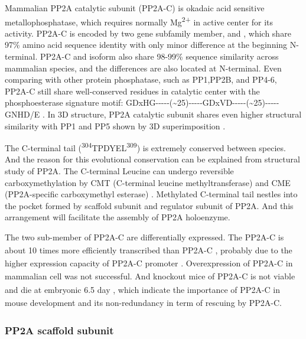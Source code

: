 Mammalian \gls{PP2A} catalytic subunit (PP2A-C) is okadaic acid sensitive metallophosphatase, which requires normally Mg\textsuperscript{2+} in active center for its activity. PP2A-C is encoded by two gene subfamily member, \textalpha{} and \textbeta{}, which share 97\% amino acid sequence identity with only minor difference at the beginning N-terminal. PP2A-C \textalpha{} and \textbeta{} isoform also share 98-99\% sequence similarity across mammalian species, and the differences are also located at N-terminal. Even comparing with other protein phosphatase, such as PP1,PP2B, and PP4-6, PP2A-C still share well-conserved residues in catalytic center with the phosphoesterase signature motif: GDxHG-{}-{}-{}-{}-(\textasciitilde25)-{}-{}-{}-{}-GDxVD-{}-{}-{}-{}-(\textasciitilde25)-{}-{}-{}-{}-GNHD/E \cite{ogris_catalytically_1999}. In 3D structure, PP2A catalytic subunit shares even higher structural similarity with PP1 and PP5 shown by 3D superimposition \cite{xing_structure_2006}.  


The C-terminal tail (\textsuperscript{304}TPDYEL\textsuperscript{309}) is extremely conserved between species. And the reason for this evolutional conservation can be explained from structural study of PP2A. The C-terminal Leucine can undergo reversible carboxymethylation by CMT (C-terminal leucine methyltransferase) and CME (PP2A-specific carboxymethyl esterase) \cite{mumby_3d_2007}. Methylated C-terminal tail nestles into the pocket formed by scaffold subunit and regulator subunit of PP2A. And this arrangement will facilitate the assembly of PP2A holoenzyme. 

The two sub-member of PP2A-C are differentially expressed. The PP2A-C\textsubscript{\textalpha} is about 10 times more efficiently transcribed than PP2A-C\textsubscript{\textbeta} \cite{khew-goodall_tissue-specific_1988}, probably due to the higher expression capacity of PP2A-C\textsubscript{\textalpha} promoter \cite{khew-goodall_structure_1991}. Overexpression of PP2A-C in mammalian cell was not successful. And knockout mice of PP2A-C\textsubscript{\textalpha} is not viable and die at embryonic 6.5 day \cite{gotz_delayed_1998}, which indicate the importance of PP2A-C\textsubscript{\textalpha} in mouse development and its non-redundancy in term of rescuing by PP2A-C\textsubscript{\textbeta}.

\subsubsection{PP2A scaffold subunit}

